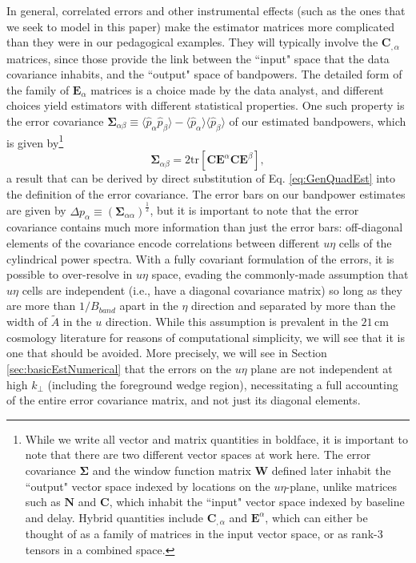 \documentclass[twocolumn,aps,prd,nofootinbib,showpacs]{revtex4-1}
\begin{document}
In general, correlated errors and other instrumental effects (such as the ones that we seek to model in this paper) make the estimator matrices more complicated than they were in our pedagogical examples.  They will typically involve the $\mathbf{C}_{,\alpha}$ matrices, since those provide the link between the ``input" space that the data covariance inhabits, and the ``output" space of bandpowers.  The detailed form of the family of $\mathbf{E}_\alpha$ matrices is a choice made by the data analyst, and different choices yield estimators with different statistical properties.  One such property is the error covariance $\boldsymbol \Sigma_{\alpha \beta} \equiv \langle \widehat{p}_\alpha \widehat{p}_\beta \rangle - \langle \widehat{p}_\alpha \rangle \langle \widehat{p}_\beta \rangle $ of our estimated bandpowers, which is given by\footnote{While we write all vector and matrix quantities in boldface, it is important to note that there are two different vector spaces at work here.  The error covariance $\boldsymbol \Sigma$ and the window function matrix $\mathbf{W}$ defined later inhabit the ``output" vector space indexed by locations on the $u\eta$-plane, unlike matrices such as $\mathbf{N}$ and $\mathbf{C}$, which inhabit the ``input" vector space indexed by baseline and delay.  Hybrid quantities include $\mathbf{C}_{,\alpha}$ and $\mathbf{E}^\alpha$, which can either be thought of as a family of matrices in the input vector space, or as rank-3 tensors in a combined space.}
\begin{equation}
\label{eq:matrixErrorCovar}
\boldsymbol \Sigma_{\alpha \beta} = 2 \textrm{tr} \left[ \mathbf{C} \mathbf{E}^\alpha \mathbf{C} \mathbf{E}^\beta \right],
\end{equation}
a result that can be derived by direct substitution of  Eq. \eqref{eq:GenQuadEst} into the definition of the error covariance.  The error bars on our bandpower estimates are given by $\Delta p_\alpha \equiv (\boldsymbol \Sigma_{\alpha \alpha})^{\frac{1}{2}}$, but it is important to note that the error covariance contains much more information than just the error bars: off-diagonal elements of the covariance encode correlations between different $u\eta$ cells of the cylindrical power spectra.  With a fully covariant formulation of the errors, it is possible to over-resolve in $u\eta$ space, evading the commonly-made assumption that $u\eta$ cells are independent (i.e., have a diagonal covariance matrix) so long as they are more than $1/B_{band}$ apart in the $\eta$ direction and separated by more than the width of $\widetilde{A}$ in the $u$ direction.  While this assumption is prevalent in the $21\,\textrm{cm}$ cosmology literature for reasons of computational simplicity, we will see that it is one that should be avoided.  More precisely, we will see in Section \ref{sec:basicEstNumerical} that the errors on the $u\eta$ plane are not independent at high $k_\perp$ (including the foreground wedge region), necessitating a full accounting of the entire error covariance matrix, and not just its diagonal elements.
\end{document}
